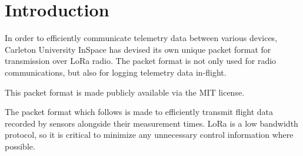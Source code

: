 \section{Introduction} \label{sec:introduction}

In order to efficiently communicate telemetry data between various devices, Carleton University InSpace has devised its
own unique packet format for transmission over LoRa radio. The packet format is not only used for radio communications,
but also for logging telemetry data in-flight.

This packet format is made publicly available via the MIT license.

The packet format which follows is made to efficiently transmit flight data recorded by sensors alongside their
measurement times. LoRa is a low bandwidth protocol, so it is critical to minimize any unnecessary control information
where possible.
